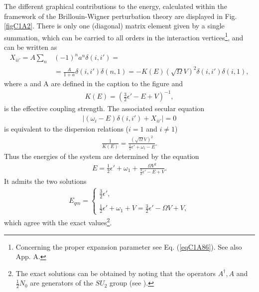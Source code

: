 The different graphical contributions to the energy, calculated within the framework of the
Brillouin-Wigner perturbation theory are displayed in Fig. \ref{figC1A2}. There is only
one (diagonal) matrix element given by a single summation, which can be
carried to all orders in the interaction vertices\footnote{Concerning the proper expansion parameter see  Eq. (\ref{eqC1A86}). See also \cite{Broglia:19d} App. A.}, and can be written as
 \begin{align}\label{eqC1A31} 
\nonumber X_{ii'}=A\sum_n&(-1)^na^n\delta(i,i')=\\
&=\frac{A}{1+a}\delta(i,i')\delta(n,1)=-K(E)(\sqrt{\Omega}V)^2\delta(i,i')\delta(i,1),
 \end{align}
where a and A are defined in the caption to the figure and
 \begin{align}\label{eqC1A32} 
K(E)=\left(\tfrac{3}{2}\epsilon'-E+V\right)^{-1},
 \end{align}
 is the effective coupling strength.
The associated secular equation
 \begin{align}\label{eqC1A33} 
\left|(\omega_i-E)\delta(i,i')+X_{ii'}\right|=0
 \end{align}
is equivalent to the dispersion relations ($i=1$ and $i\neq1$)
 \begin{align}\label{eqC1A34} 
\frac{1}{K(E)}=\frac{\left(\sqrt{\Omega}V\right)^2}{\frac{1}{2}\epsilon'+\omega_i-E}.
 \end{align}
Thus the energies of the system are determined by the equation
 \begin{align}\label{eqC1A35} 
E=\frac{1}{2}\epsilon'+\omega_1+\frac{\Omega V^2}{\tfrac{3}{2}\epsilon'-E+V}.
 \end{align}
It admits the two solutions
 \begin{align}\label{eqC1A36} 
E_{qm}=\left\{\begin{array}{l}
\frac{3}{2}\epsilon', \\ 
\\
\frac{1}{2}\epsilon'+\omega_1+V=\frac{3}{2}\epsilon'-\Omega V+V,
\end{array} 
\right.
 \end{align}
which agree with the exact values\footnote{The exact solutions can be  obtained  by noting that the operators $A^\dagger,A$ and $\frac{1}{2}N_0$ are generators of the $SU_2$ group (see \cite{Bortignon:77}).}.


